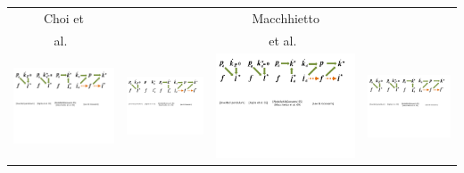 \documentclass{llncs}
\begin{document}
\begin{table}[h]
\begin{center}
\begin{tabular}{c|c|c|c}
{\scriptsize Choi et }& &{\scriptsize Macchhietto} & {\scriptsize~\cite{LG12}}\\
{\scriptsize al.~\cite{Choi07}}& &{\scriptsize et al.~\cite{Macchietto09}} & \\
\hline
\hline
\includegraphics[width=0.13\columnwidth]{Figures/lkpf-diagram-LIPM.pdf}
&
\includegraphics[width=0.13\columnwidth]{Figures/lkpf-diagram-resolvedMomentum.pdf}
&
\includegraphics[width=0.13\columnwidth]{Figures/lkpf-diagram-maccietto.pdf}
&
\includegraphics[width=0.23\columnwidth]{Figures/lkpf-diagram-LeeGoswami.pdf} \\
\hline
\end{tabular}
\label{tab:comparison}
\end{center}
\end{table}


\end{document}
